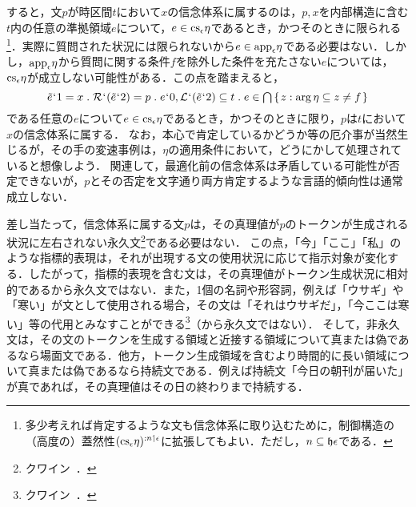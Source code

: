 すると，文$p$が時区間$t$において$x$の信念体系に属するのは，$p,x$を内部構造に含む$t$内の任意の準拠領域$e$について，$e\in\mathrm{cs}_{\epsilon}\eta$であるとき，かつそのときに限られる\footnote{多少考えれば肯定するような文も信念体系に取り込むために，制御構造の（高度の）蓋然性$ (\mathrm{cs}_{\epsilon}\eta)^{:n\mathbin{\upharpoonleft}\epsilon} $に拡張してもよい．ただし，$n\subseteq\mathfrak{h}\epsilon$である．}．実際に質問された状況には限られないから$ e\in\mathrm{app}_{\epsilon}\eta $である必要はない．しかし，$\mathrm{app}_{\epsilon}\eta$から質問に関する条件$ f $を除外した条件を充たさない$e$については，$\mathrm{cs}_{\epsilon}\eta$が成立しない可能性がある．この点を踏まえると，
\[
    \tilde{e}\fap 1 = x\con{1}\mathcal{R}\fap(\tilde{e}\fap 2)= p\con{1}
    e\fap 0,\mathcal{L}\fap(\tilde{e}\fap 2)\subseteq t\con{1}e\in\intersect{\classab{z:\arg\eta\subseteq z\neq f}}
\]
である任意の$e$について$ e\in\mathrm{cs}_{\epsilon}\eta $であるとき，かつそのときに限り，$p$は$t$において$x$の信念体系に属する．
なお，本心で肯定しているかどうか等の厄介事が当然生じるが，その手の変速事例は，$\eta$の適用条件において，どうにかして処理されていると想像しよう．
関連して，最適化前の信念体系は矛盾している可能性が否定できないが，$p$とその否定を文字通り両方肯定するような言語的傾向性は通常成立しない．

差し当たって，信念体系に属する文$p$は，その真理値が$p$のトークンが生成される状況に左右されない永久文\footnote{クワイン~\cite[p.\,325]{クワインd}．}である必要はない．
この点，「今」「ここ」「私」のような指標的表現は，それが出現する文の使用状況に応じて指示対象が変化する．したがって，指標的表現を含む文は，その真理値がトークン生成状況に相対的であるから永久文ではない．また，1個の名詞や形容詞，例えば「ウサギ」や「寒い」が文として使用される場合，その文は「それはウサギだ」，「今ここは寒い」等の代用とみなすことができる\footnote{クワイン~\cite[p.\,5]{クワインe}．}（から永久文ではない）．
そして，非永久文は，その文のトークンを生成する領域と近接する領域について真または偽であるなら場面文である．他方，トークン生成領域を含むより時間的に長い領域について真または偽であるなら持続文である．例えば持続文「今日の朝刊が届いた」が真であれば，その真理値はその日の終わりまで持続する．

